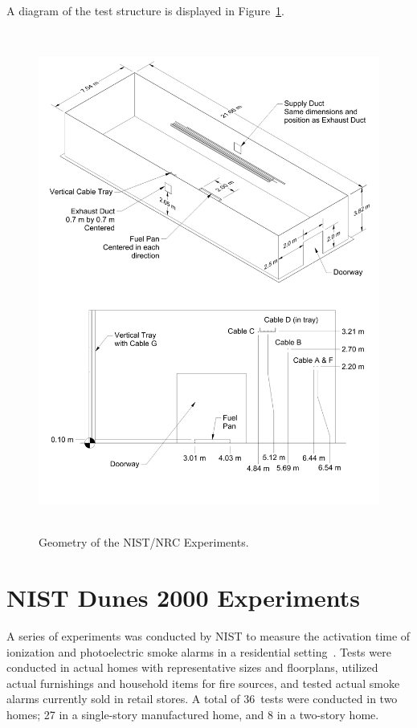 A diagram of the test structure is displayed in Figure~\ref{NIST_NRC_Drawing}.

\begin{figure}
\begin{center}
\includegraphics[height=6.5in]{FIGURES/NIST_NRC/NIST_NRC_Drawing}
\end{center}
\caption[Geometry of the NIST/NRC Experiments]{Geometry of the NIST/NRC Experiments.}
\label{NIST_NRC_Drawing}
\end{figure}


\clearpage

\section{NIST Dunes 2000 Experiments}

A series of experiments was conducted by NIST to measure the activation time of ionization and photoelectric
smoke alarms in a residential setting~\cite{Bukowski:1}. Tests were conducted in actual homes with
representative sizes and floorplans, utilized actual furnishings and household items for fire sources,
and tested actual smoke alarms currently sold in retail stores. A total of 36~tests were conducted in two
homes; 27 in a single-story manufactured home, and 8 in a two-story home.

